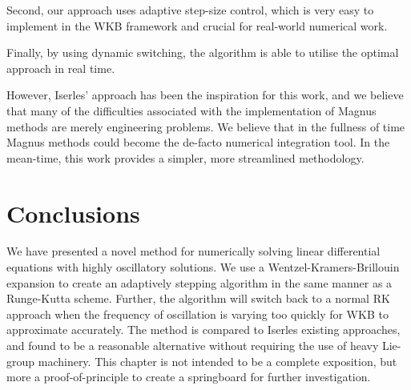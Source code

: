 Second, our approach uses adaptive step-size control, which is very easy to implement in the WKB framework and crucial for real-world numerical work.

Finally, by using dynamic switching, the algorithm is able to utilise the optimal approach in real time.

However, Iserles' approach has been the inspiration for this work, and we believe that many of the difficulties associated with the implementation of Magnus methods are merely engineering problems. We believe that in the fullness of time Magnus methods could become the de-facto numerical integration tool. In the mean-time, this work provides a simpler, more streamlined methodology.


\section{Conclusions}



We have presented a novel method for numerically solving linear differential equations with highly oscillatory solutions. We use a Wentzel-Kramers-Brillouin expansion to create an adaptively stepping algorithm in the same manner as a Runge-Kutta scheme. Further, the algorithm will switch back to a normal RK approach when the frequency of oscillation is varying too quickly for WKB to approximate accurately. The method is compared to Iserles existing approaches, and found to be a reasonable alternative without requiring the use of heavy Lie-group machinery. This chapter is not intended to be a complete exposition, but more a proof-of-principle to create a springboard for further investigation.



\begin{subappendices}
  
\end{subappendices}


